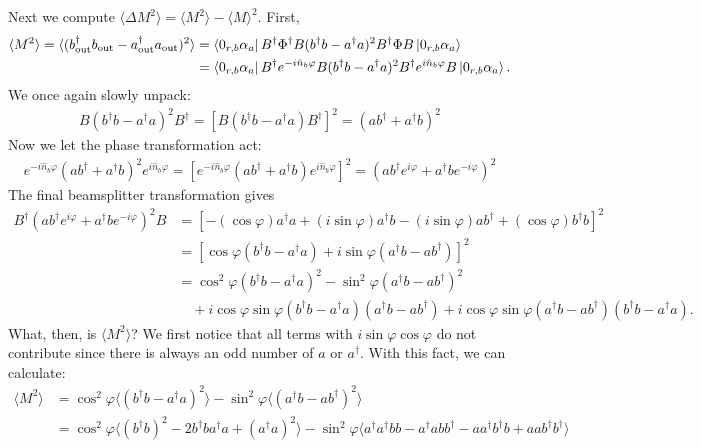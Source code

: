 \documentclass{article}
\theoremstyle{definition}
\newcommand{\al}{\alpha}
\begin{document}
\begin{enumerate}[label=(\alph*)]
\noindent Next we compute $\langle \Delta M^2 \rangle = \langle M^2 \rangle - \langle M \rangle^2$. First, 
\begin{align*}
\langle M^2 \rangle 
= \langle (b_\text{out}^\dagger b_\text{out} - a_\text{out}^\dagger a_\text{out})^2 \rangle 
&= \bra{0_{r,b} \al_a} B^\dagger \Phi^\dagger B   (b^\dagger b - a^\dagger a)^2 B^\dagger \Phi B  \ket{0_{r,b} \al_a}\\
&= \bra{0_{r,b} \al_a} B^\dagger e^{-i \hat{n}_b \varphi} B   (b^\dagger b - a^\dagger a)^2 B^\dagger e^{i \hat{n}_b \varphi} B  \ket{0_{r,b} \al_a}.
\end{align*}
We once again slowly unpack:
\begin{align*}
B   (b^\dagger b - a^\dagger a)^2 B^\dagger = [B   (b^\dagger b - a^\dagger a) B^\dagger]^2  = (ab^\dagger + a^\dagger b)^2 
\end{align*}
Now we let the phase transformation act:
\begin{align*}
e^{-i \hat{n}_b \varphi} (ab^\dagger + a^\dagger b)^2 e^{i \hat{n}_b \varphi} = [ e^{-i \hat{n}_b \varphi} (ab^\dagger + a^\dagger b) e^{i \hat{n}_b \varphi}   ]^2 = (a b^\dagger e^{i\varphi} + a^\dagger b e^{-i\varphi})^2
\end{align*}
The final beamsplitter transformation gives 
\begin{align*}
B^\dagger (a b^\dagger e^{i\varphi} + a^\dagger b e^{-i\varphi})^2 B 
&= [ -(\cos\varphi) a^\dagger a  
+ 
(i\sin\varphi) a^\dagger b 
- 
(i\sin\varphi) ab^\dagger 
+ 
(\cos\varphi) b^\dagger b ]^2 \\
&= [\cos\varphi (b^\dagger b - a^\dagger a) + i\sin\varphi (a^\dagger b - ab^\dagger )   ]^2 \\
&= \cos^2\varphi (b^\dagger b - a^\dagger a)^2 - \sin^2\varphi ( a^\dagger b - ab^\dagger )^2 \\
&\quad + i\cos\varphi\sin\varphi (b^\dagger b - a^\dagger a)( a^\dagger b -ab^\dagger) 
+ i\cos\varphi\sin\varphi (a^\dagger b - ab^\dagger)(b^\dagger b - a^\dagger a).
\end{align*}
What, then, is $\langle M^2 \rangle$? We first notice that all terms with $i\sin\varphi\cos\varphi$ do not contribute since there is always an odd number of $a$ or $a^\dagger$. With this fact, we can calculate:
\begin{align*}
\langle M^2 \rangle 
&= \cos^2\varphi \langle (b^\dagger b - a^\dagger a )^2 \rangle - \sin^2 \varphi \langle (a^\dagger b - ab^\dagger )^2 \rangle \\ 
&= \cos^2 \varphi \langle  (b^\dagger b)^2 - 2 b^\dagger b a^\dagger a + (a^\dagger a)^2  \rangle - \sin^2 \varphi \langle  a^\dagger a^\dagger bb - a^\dagger a bb^\dagger - aa^\dagger b^\dagger b + aab^\dagger b^\dagger  \rangle \\

\end{align*}
\end{enumerate}
\end{document}
